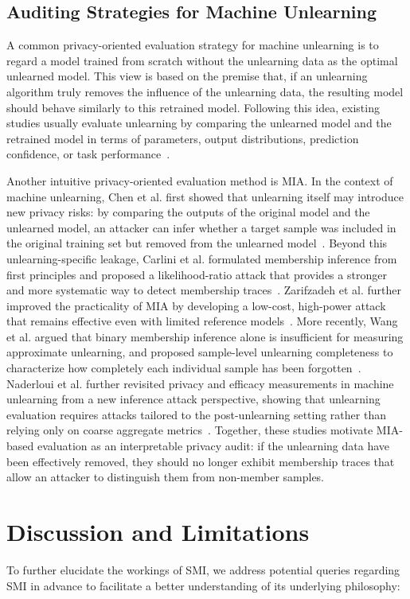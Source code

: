 \documentclass{article}
\theoremstyle{plain}
\theoremstyle{definition}
\theoremstyle{remark}
\begin{document}
\subsection{Auditing Strategies for Machine Unlearning}
A common privacy-oriented evaluation strategy for machine unlearning is to regard a model trained from scratch without the unlearning data as the optimal unlearned model. This view is based on the premise that, if an unlearning algorithm truly removes the influence of the unlearning data, the resulting model should behave similarly to this retrained model. Following this idea, existing studies usually evaluate unlearning by comparing the unlearned model and the retrained model in terms of parameters, output distributions, prediction confidence, or task performance~\cite{New1,unlearningS}.

Another intuitive privacy-oriented evaluation method is MIA. In the context of machine unlearning, Chen et al. first showed that unlearning itself may introduce new privacy risks: by comparing the outputs of the original model and the unlearned model, an attacker can infer whether a target sample was included in the original training set but removed from the unlearned model~\cite{Unleark}. Beyond this unlearning-specific leakage, Carlini et al. formulated membership inference from first principles and proposed a likelihood-ratio attack that provides a stronger and more systematic way to detect membership traces~\cite{Lira}. Zarifzadeh et al. further improved the practicality of MIA by developing a low-cost, high-power attack that remains effective even with limited reference models~\cite{RMIA}. More recently, Wang et al. argued that binary membership inference alone is insufficient for measuring approximate unlearning, and proposed sample-level unlearning completeness to characterize how completely each individual sample has been forgotten~\cite{IAM}. Naderloui et al. further revisited privacy and efficacy measurements in machine unlearning from a new inference attack perspective, showing that unlearning evaluation requires attacks tailored to the post-unlearning setting rather than relying only on coarse aggregate metrics~\cite{newmia1}. Together, these studies motivate MIA-based evaluation as an interpretable privacy audit: if the unlearning data have been effectively removed, they should no longer exhibit membership traces that allow an attacker to distinguish them from non-member samples.


\section{Discussion and Limitations}
To further elucidate the workings of SMI, we address potential queries regarding SMI in advance to facilitate a better understanding of its underlying philosophy:
\end{document}

